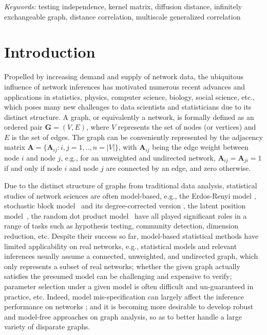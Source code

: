 \documentclass[11pt]{article}
\theoremstyle{definition}
\begin{document}
\noindent%
{\it Keywords:} testing independence, kernel matrix, diffusion distance, infinitely exchangeable graph, distance correlation, multiscale generalized correlation

\sloppy
\doublespacing

\section{Introduction}
\label{sec:intro}

Propelled by increasing demand and supply of network data, the ubiquitous influence of network inferences has motivated numerous recent advances and applications in statistics, physics, computer science, biology, social science, etc., which poses many new challenges to data scientists and statisticians due to its distinct structure. A graph, or equivalently a network, is formally defined as an ordered pair $\mathbf{G}=(V,E)$, where $V$ represents the set of nodes (or vertices) and $E$ is the set of edges. The graph can be conveniently represented by the adjacency matrix $\mathbf{A} = \{\mathbf{A}_{ij} : i,j= 1,..,n = |V| \}$, with $\mathbf{A}_{ij}$ being the edge weight between node $i$ and node $j$, e.g., for an unweighted and undirected network, $\mathbf{A}_{ij} =\mathbf{A}_{ji} = 1$ if and only if node $i$ and node $j$ are connected by an edge, and zero otherwise.

Due to the distinct structure of graphs from traditional data analysis, statistical studies of network sciences are often model-based, e.g., the Erdos-Renyi model \cite{erdosrenyi1959,Gilbert1959}, stochastic block model~\cite{HollandEtAl1983, rohe2011spectral,SussmanEtAl2012,Lei2015} and its degree-corrected version \cite{karrer2011stochastic, ZhaoLevinaZhu2012}, the latent position model~\cite{TangSussmanPriebe2013,fosdick2015testing}, the random dot product model~\cite{YoungScheinerman2007, sussman2014consistent} have all played significant roles in a range of tasks such as hypothesis testing, community detection, dimension reduction, etc. Despite their success so far, model-based statistical methods have limited applicability on real networks, e.g., statistical models and relevant inferences usually assume a connected, unweighted, and undirected graph, which only represents a subset of real networks; whether the given graph actually satisfies the presumed model can be challenging and expensive to verify; parameter selection under a given model is often difficult and un-guaranteed in practice, etc. Indeed, model mis-specification can largely affect the inference performance on networks \cite{ChenShenVogelsteinPriebe2016}; and it is becoming more desirable to develop robust and model-free approaches on graph analysis, so as to better handle a large variety of disparate graphs. 
\end{document}
